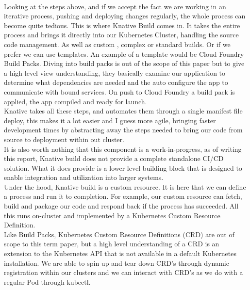 \\Looking at the steps above, and if we accept the fact we are working in an iterative process, pushing and deploying changes regularly, the whole process can become quite tedious. This is where Knative Build comes in. It takes the entire process and brings it directly into our Kubernetes Cluster, handling the source code management. As well as custom , complex or standard builds. Or if we prefer we can use templates. An example of a template would be Cloud Foundry Build Packs. Diving into build packs is out of the scope of this paper but to give a high level view understanding, they basically examine our application to determine what dependencies are needed and the auto configure the app to communicate with bound services. On push to Cloud Foundry a build pack is applied, the app compiled and ready for launch.
\\Knative takes all these steps, and automates them through a single manifest file deploy, this makes it a lot easier and I guess more agile, bringing faster development times by abstracting away the steps needed to bring our code from source to deployment within out cluster.
\\It is also worth nothing that this component is a work-in-progress, as of writing this report, Knative build does not provide a complete standalone CI/CD solution. What it does provide is a lower-level building block that is designed to enable integration and utilization into larger systems.
\\Under the hood, Knative build is a custom resource. It is here that we can define a process and run it to completion. For example, our custom resource can fetch, build and package our code and respond back if the process has succeeded. All this runs on-cluster and implemented by a Kubernetes Custom Resource Definition.
\\Like Build Packs, Kubernetes Custom Resource Definitions (CRD) are out of scope to this term paper, but a high level understanding of a CRD is an extension to the Kubernetes API that is not available in a default Kubernetes installation. We are able to spin up and tear down CRD's through dynamic registration within our clusters and we can interact with CRD's as we do with a regular Pod through kubectl.

